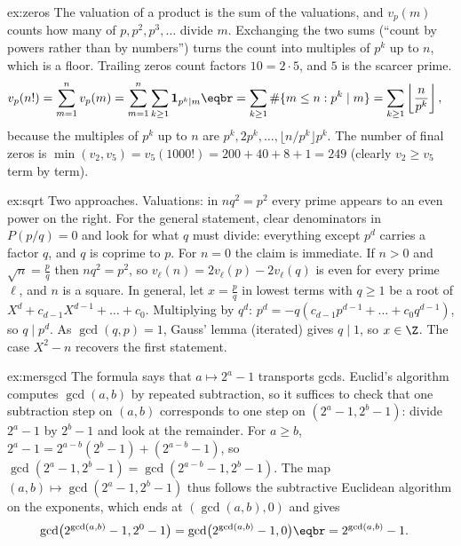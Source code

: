 \begin{solution}{ex:zeros}
\idea The valuation of a product is the sum of the valuations, and $v_p(m)$ counts how many of $p,p^2,p^3,\dots$ divide $m$. Exchanging the two sums (``count by powers rather than by numbers'') turns the count into multiples of $p^k$ up to $n$, which is a floor. Trailing zeros count factors $10=2\cdot5$, and $5$ is the scarcer prime.
\writeup
\[\begin{aligned}v_p(n!)&=\sum_{m=1}^nv_p(m)=\sum_{m=1}^n\sum_{k\ge1}\mathbf 1_{p^k\mid m}\eqbr=\sum_{k\ge1}\#\{m\le n:p^k\mid m\}=\sum_{k\ge1}\left\lfloor\frac n{p^k}\right\rfloor,\end{aligned}\]
because the multiples of $p^k$ up to $n$ are $p^k,2p^k,\dots,\lfloor n/p^k\rfloor p^k$.
The number of final zeros is $\min(v_2,v_5)=v_5(1000!)=200+40+8+1=249$ (clearly $v_2\ge v_5$ term by term).
\end{solution}

\begin{solution}{ex:sqrt}
\idea Two approaches. Valuations: in $nq^2=p^2$ every prime appears to an even power on the right. For the general statement, clear denominators in $P(p/q)=0$ and look for what $q$ must divide: everything except $p^d$ carries a factor $q$, and $q$ is coprime to $p$.
\writeup For $n=0$ the claim is immediate. If $n>0$ and $\sqrt n=\frac pq$ then $nq^2=p^2$, so $v_\ell(n)=2v_\ell(p)-2v_\ell(q)$ is even for every prime $\ell$, and $n$ is a square. In general, let $x=\frac pq$ in lowest terms with $q\ge1$ be a root of $X^d+c_{d-1}X^{d-1}+\dots+c_0$. Multiplying by $q^d$: $p^d=-q\left(c_{d-1}p^{d-1}+\dots+c_0q^{d-1}\right)$, so $q\mid p^d$. As $\gcd(q,p)=1$, Gauss' lemma (iterated) gives $q\mid1$, so $x\in\Z$. The case $X^2-n$ recovers the first statement.
\end{solution}

\begin{solution}{ex:mersgcd}
\idea The formula says that $a\mapsto2^a-1$ transports gcds. Euclid's algorithm computes $\gcd(a,b)$ by repeated subtraction, so it suffices to check that one subtraction step on $(a,b)$ corresponds to one step on $(2^a-1,2^b-1)$: divide $2^a-1$ by $2^b-1$ and look at the remainder.
\writeup For $a\ge b$, $2^a-1=2^{a-b}\left(2^b-1\right)+\left(2^{a-b}-1\right)$, so $\gcd(2^a-1,2^b-1)=\gcd(2^{a-b}-1,2^b-1)$. The map $(a,b)\mapsto\gcd(2^a-1,2^b-1)$ thus follows the subtractive Euclidean algorithm on the exponents, which ends at $(\gcd(a,b),0)$ and gives
\[\begin{aligned}\gcd\bigl(2^{\gcd(a,b)}-1,2^0-1\bigr)&=\gcd\bigl(2^{\gcd(a,b)}-1,0\bigr)\eqbr=2^{\gcd(a,b)}-1.\end{aligned}\]
\end{solution}

